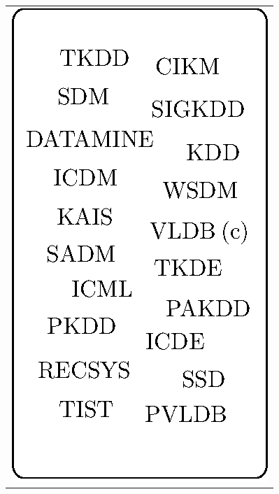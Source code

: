 \documentclass[msc]{ppgccufmg}
\begin{document}
\begin{table}[htbp]
\begin{tabular}{c}
\multirow{20}{*}{\includegraphics{fig/dm-norm-venues-blob.eps}} \\ %
\\
\\
\\
\\
\\
\\
\\
\\
\\
\\
\\
\\
\\
\\
\\
\\
\\
\\
\\
\bottomrule
\end{tabular} \ \

\end{table}
\end{document}
